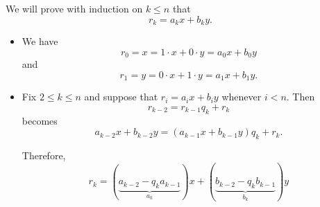 \begin{defproof}
  We will prove with induction on \( k \leq n \) that
  \begin{equation*}
    r_k = a_k x + b_k y.
  \end{equation*}

  \begin{itemize}
    \item We have
    \begin{equation*}
      r_0 = x = 1 \cdot x + 0 \cdot y = a_0 x + b_0 y
    \end{equation*}
    and
    \begin{equation*}
      r_1 = y = 0 \cdot x + 1 \cdot y = a_1 x + b_1 y.
    \end{equation*}

    \item Fix \( 2 \leq k \leq n \) and suppose that \( r_i = a_i x + b_i y \) whenever \( i < n \). Then
    \begin{equation*}
      r_{k-2} = r_{k-1} q_k + r_k
    \end{equation*}
    becomes
    \begin{equation*}
      a_{k-2} x + b_{k-2} y = (a_{k-1} x + b_{k-1} y) q_k + r_k.
    \end{equation*}

    Therefore,
    \begin{equation*}
      r_k = (\underbrace{a_{k-2} - q_k a_{k-1}}_{a_k}) x + (\underbrace{b_{k-2} - q_k b_{k-1}}_{b_k}) y
    \end{equation*}
  \end{itemize}
\end{defproof}

